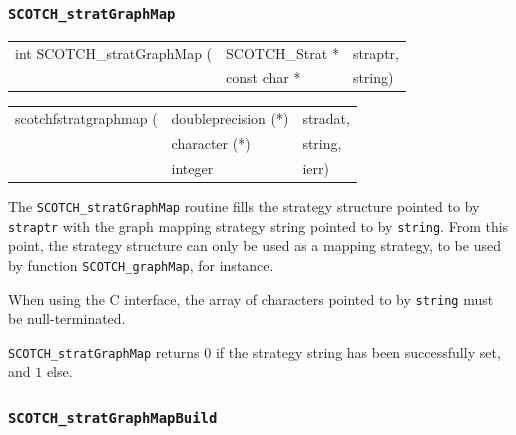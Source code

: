 \subsubsection{{\tt SCOTCH\_stratGraphMap}}

\begin{itemize}
\progsyn

{\tt\begin{tabular}{l@{}ll}
int SCOTCH\_stratGraphMap ( & SCOTCH\_Strat * & straptr, \\
                            & const char *    & string)
\end{tabular}}

{\tt\begin{tabular}{l@{}ll}
scotchfstratgraphmap ( & doubleprecision (*) & stradat, \\
                       & character (*)       & string,  \\
                       & integer             & ierr)
\end{tabular}}

\progdes

The {\tt SCOTCH\_stratGraphMap} routine fills the strategy
structure pointed to by {\tt straptr} with the graph mapping
strategy string pointed to by {\tt string}. From this point,
the strategy structure can only be used as a mapping strategy,
to be used by function {\tt SCOTCH\_\lbt graph\lbt Map},
for instance.

When using the C interface, the array of characters pointed to by
{\tt string} must be null-terminated.

\progret

{\tt SCOTCH\_stratGraphMap} returns $0$ if the strategy string
has been successfully set, and $1$ else.
\end{itemize}

\subsubsection{{\tt SCOTCH\_stratGraphMapBuild}}
\label{sec-lib-func-stratgraphmapbuild}


